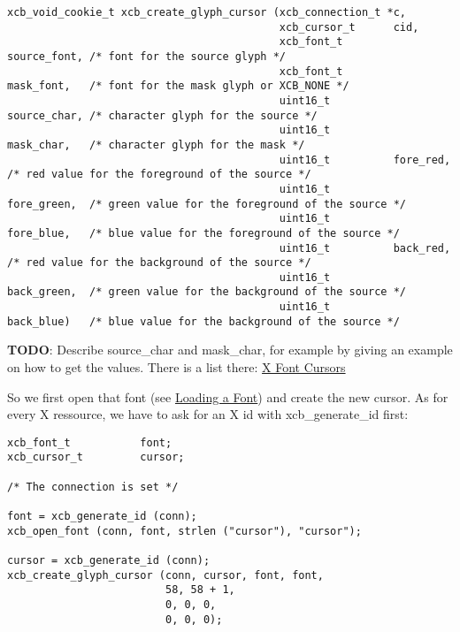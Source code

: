 \documentclass[12pt,oneside,titlepage]{book}
\begin{document}
\begin{enumerate}
\begin{enumerate}
\begin{verbatim}
xcb_void_cookie_t xcb_create_glyph_cursor (xcb_connection_t *c,
                                           xcb_cursor_t      cid,
                                           xcb_font_t        source_font, /* font for the source glyph */
                                           xcb_font_t        mask_font,   /* font for the mask glyph or XCB_NONE */
                                           uint16_t          source_char, /* character glyph for the source */
                                           uint16_t          mask_char,   /* character glyph for the mask */
                                           uint16_t          fore_red,    /* red value for the foreground of the source */
                                           uint16_t          fore_green,  /* green value for the foreground of the source */
                                           uint16_t          fore_blue,   /* blue value for the foreground of the source */
                                           uint16_t          back_red,    /* red value for the background of the source */
                                           uint16_t          back_green,  /* green value for the background of the source */
                                           uint16_t          back_blue)   /* blue value for the background of the source */
\end{verbatim}

    \textbf{TODO}: Describe {source\_char} and {mask\_char}, for example
    by giving an example on how to get the values. There is a list
    there: \href{http://tronche.com/gui/x/xlib/appendix/b/}{X Font
    Cursors}

    So we first open that font (see \protect\hyperlink{loadfont}{Loading
    a Font}) and create the new cursor. As for every X ressource, we
    have to ask for an X id with {xcb\_generate\_id} first:

\begin{verbatim}
xcb_font_t           font;
xcb_cursor_t         cursor;

/* The connection is set */

font = xcb_generate_id (conn);
xcb_open_font (conn, font, strlen ("cursor"), "cursor");

cursor = xcb_generate_id (conn);
xcb_create_glyph_cursor (conn, cursor, font, font,
                         58, 58 + 1,
                         0, 0, 0,
                         0, 0, 0);
\end{verbatim}


\end{enumerate}
\end{enumerate}
\end{document}
